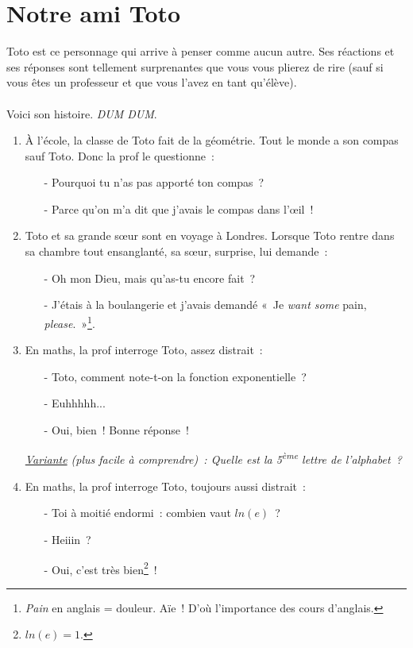 \documentclass[10pt,a5paper,fullpage]{book}
\begin{document}
	\chapter{Notre ami Toto}
	Toto est ce personnage qui arrive à penser comme aucun autre. Ses réactions et ses réponses sont tellement surprenantes que vous vous plierez de rire (sauf si vous êtes un professeur et que vous l'avez en tant qu'élève). \\ \\
	Voici son histoire. \textit{DUM DUM}. 
	\newpage
	\begin{enumerate}
		\item À l’école, la classe de Toto fait de la géométrie. Tout le monde a son compas sauf Toto. Donc la prof le questionne~:
		\begin{itemize}
			\item[-] Pourquoi tu n’as pas apporté ton compas~?
			\item[-] Parce qu’on m’a dit que j’avais le compas dans l’œil~! 
		\end{itemize}
		
		\item Toto et sa grande sœur sont en voyage à Londres. Lorsque Toto rentre dans sa chambre tout ensanglanté, sa sœur, surprise, lui demande~:
		\begin{itemize}
			\item[-] Oh mon Dieu, mais qu'as-tu encore fait~?
			\item[-] J’étais à la boulangerie et j’avais demandé « Je \textit{want some} pain, \textit{please}. »\footnote{\textit{Pain} en anglais = douleur. Aïe~! D'où l'importance des cours d'anglais.}.
		\end{itemize}
		
		\item En maths, la prof interroge Toto, assez distrait~: 
		\begin{itemize}
			\item[-] Toto, comment note-t-on la fonction exponentielle~?
			\item[-] Euhhhhh...
			\item[-] Oui, bien~! Bonne réponse~!
		\end{itemize}
		\textit{\underline{Variante} (plus facile à comprendre)~: Quelle est la 5\textsuperscript{ème} lettre de l’alphabet~?}
		
		\item En maths, la prof interroge Toto, toujours aussi distrait~:
		\begin{itemize}
			\item[-] Toi à moitié endormi~: combien vaut $ln(e)$~?
			\item[-] Heiiin~?
			\item[-] Oui, c’est très bien\footnote{$ln(e) = 1$.}~!
		\end{itemize}
		

\end{enumerate}
\end{document}
